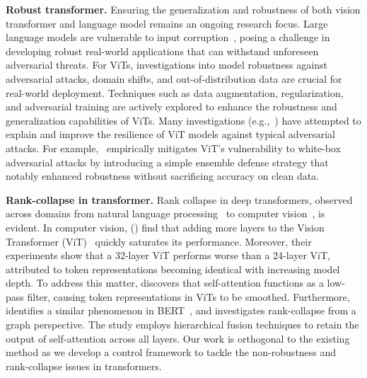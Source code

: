 \textbf{Robust transformer.}
Ensuring the generalization and robustness of both vision transformer and language model remains an ongoing research focus. Large language models are vulnerable to input corruption~\cite{005357537ef34c158137a70c5df3799b, peyrard-etal-2022-invariant, jin2020bert, zang2019word}, posing a challenge in developing robust real-world applications that can withstand unforeseen adversarial threats. For ViTs, investigations into model robustness against adversarial attacks, domain shifts, and out-of-distribution data are crucial for real-world deployment. Techniques such as data augmentation, regularization, and adversarial training are actively explored to enhance the robustness and generalization capabilities of ViTs. Many investigations (e.g.,~\cite{yuan2023you, paul2022vision, mahmood2021robustness,
bhojanapalli2021understanding, madry2017towards, mao2022towards, zhou2022understanding}) have attempted to explain and improve the resilience of ViT models against typical adversarial attacks. For example,~\cite{mahmood2021robustness} empirically mitigates ViT's vulnerability to white-box adversarial attacks by introducing a simple ensemble defense strategy that notably enhanced robustness without sacrificing accuracy on clean data.

\textbf{Rank-collapse in transformer.} Rank collapse in deep transformers, observed across domains from natural language processing~\cite{shi2022revisiting} to computer vision~\cite{wang2022antioversmoothing,dong2021attention}, is evident. In computer vision, \citeauthor{zhou2021deepvit} (\citeyear{zhou2021deepvit}) find that adding more layers to the Vision Transformer (ViT)~\cite{DosovitskiyB0WZ21} quickly saturates its performance. Moreover, their experiments show that a 32-layer ViT performs worse than a 24-layer ViT, attributed to token representations becoming identical with increasing model depth. To address this matter, \cite{wang2022antioversmoothing} discovers that self-attention functions as a low-pass filter, causing token representations in ViTs to be smoothed.
Furthermore, \cite{shi2022revisiting} identifies a similar phenomenon in BERT~\cite{devlin2018bert}, and investigates rank-collapse from a graph perspective. The study employs hierarchical fusion techniques to retain the output of self-attention across all layers.
Our work is orthogonal to the existing method as we develop a control framework to tackle the non-robustness and rank-collapse issues in transformers. 
